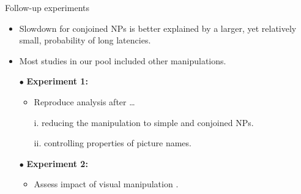 \begin{frame}{Follow-up experiments}

\setlength{\leftmargini}{0.5cm}
\setlength{\leftmarginii}{0.5cm}
\begin{itemize}
	\item Slowdown for conjoined NPs is better explained by a larger, yet relatively small, probability of long latencies.
	\item Most studies in our pool included other manipulations.
\end{itemize}
\begin{itemize}
	\item[$\bullet$] \textbf{Experiment 1:} 
	\begin{itemize}
		\item Reproduce analysis after \dots
		\item[i.] reducing the manipulation to simple and conjoined NPs.
		\item[ii.] controlling properties of picture names.
	\end{itemize}
	\item[$\bullet$] \textbf{Experiment 2:} 
	\begin{itemize}
		\item Assess impact of visual manipulation \parencite[as in][]{martin2010planning}.
	\end{itemize}
\end{itemize}

\end{frame}